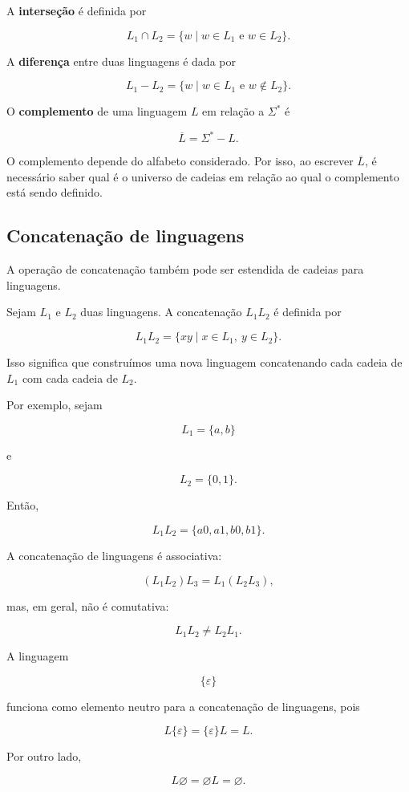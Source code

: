 \documentclass[
  brazilian,
  letterpaper,
]{book}
\theoremstyle{plain}
\theoremstyle{definition}
\theoremstyle{remark}
\begin{document}
A \textbf{interseção} é definida por

\[
L_1\cap L_2=
\{w\mid w\in L_1\text{ e }w\in L_2\}.
\]

A \textbf{diferença} entre duas linguagens é dada por

\[
L_1-L_2=
\{w\mid w\in L_1\text{ e }w\notin L_2\}.
\]

O \textbf{complemento} de uma linguagem \(L\) em relação a \(\Sigma^*\)
é

\[
\overline{L}
=
\Sigma^*-L.
\]

O complemento depende do alfabeto considerado. Por isso, ao escrever
\(\overline{L}\), é necessário saber qual é o universo de cadeias em
relação ao qual o complemento está sendo definido.

\subsection{Concatenação de
linguagens}\label{concatenauxe7uxe3o-de-linguagens}

A operação de concatenação também pode ser estendida de cadeias para
linguagens.

Sejam \(L_1\) e \(L_2\) duas linguagens. A concatenação \(L_1L_2\) é
definida por

\[
L_1L_2=
\{xy\mid x\in L_1,\ y\in L_2\}.
\]

Isso significa que construímos uma nova linguagem concatenando cada
cadeia de \(L_1\) com cada cadeia de \(L_2\).

Por exemplo, sejam

\[
L_1=\{a,b\}
\]

e

\[
L_2=\{0,1\}.
\]

Então,

\[
L_1L_2=
\{a0,a1,b0,b1\}.
\]

A concatenação de linguagens é associativa:

\[
(L_1L_2)L_3=L_1(L_2L_3),
\]

mas, em geral, não é comutativa:

\[
L_1L_2\neq L_2L_1.
\]

A linguagem

\[
\{\varepsilon\}
\]

funciona como elemento neutro para a concatenação de linguagens, pois

\[
L\{\varepsilon\}
=
\{\varepsilon\}L
=
L.
\]

Por outro lado,

\[
L\varnothing
=
\varnothing L
=
\varnothing.
\]
\end{document}
